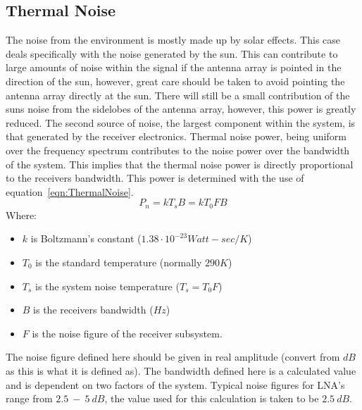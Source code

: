 \documentclass[11pt]{witseiepaper}
\begin{document}
\begin{bibunit}[witseie]
\subsection{Thermal Noise} \label{sec:ThermalNoise}
The noise from the environment is mostly made up by solar effects. This case deals specifically with the noise generated by the sun. This can contribute to large amounts of noise within the signal if the antenna array is pointed in the direction of the sun, however, great care should be taken to avoid pointing the antenna array directly at the sun. There will still be a small contribution of the suns noise from the sidelobes of the antenna array, however, this power is greatly reduced.
The second source of noise, the largest component within the system, is that generated by the receiver electronics.
Thermal noise power, being uniform over the frequency spectrum contributes to the noise power over the bandwidth of the system. This implies that the thermal noise power is directly proportional to the receivers bandwidth. This power is determined with the use of equation~\ref{eqn:ThermalNoise}.
\begin{equation} \label{eqn:ThermalNoise}
P_{n} = k T_{s} B = k T_{0} F B
\end{equation}
Where:
\begin{itemize}
    \item $k$ is Boltzmann's constant ($1.38 \cdot 10^{-23} Watt-sec/K$)
    \item $T_{0}$ is the standard temperature (normally $290 K$)
    \item $T_{s}$ is the system noise temperature ($T_{s} = T_{0} F$)
    \item $B$ is the receivers bandwidth ($Hz$)
    \item $F$ is the noise figure of the receiver subsystem.
\end{itemize}
The noise figure defined here should be given in real amplitude (convert from $dB$ as this is what it is defined as). The bandwidth defined here is a calculated value and is dependent on two factors of the system. Typical noise figures for LNA's range from $2.5~-~5~dB$, the value used for this calculation is taken to be $2.5~dB$.


\end{bibunit}
\end{document}
